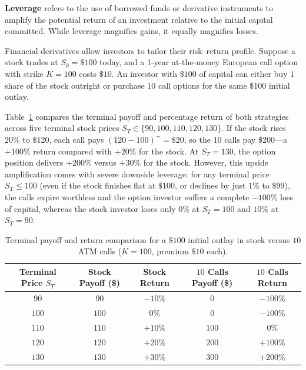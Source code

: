 \begin{definition}
\label{def:leverage}
\textbf{Leverage} refers to the use of borrowed funds or derivative instruments to amplify the potential return of an investment relative to the initial capital committed. While leverage magnifies gains, it equally magnifies losses.
\end{definition}

\begin{example}
\label{ex:option_leverage}
Financial derivatives allow investors to tailor their risk--return profile. Suppose a stock trades at $S_0 = \$100$ today, and a 1-year at-the-money European call option with strike $K = 100$ costs $\$10$. An investor with $\$100$ of capital can either buy $1$ share of the stock outright or purchase $10$ call options for the same $\$100$ initial outlay.

Table~\ref{tab:option_leverage} compares the terminal payoff and percentage return of both strategies across five terminal stock prices $S_T \in \{90, 100, 110, 120, 130\}$. If the stock rises $20\%$ to $\$120$, each call pays $(120 - 100)^+ = \$20$, so the $10$ calls pay $\$200$---a $+100\%$ return compared with $+20\%$ for the stock. At $S_T = 130$, the option position delivers $+200\%$ versus $+30\%$ for the stock. However, this upside amplification comes with severe downside leverage: for any terminal price $S_T \le 100$ (even if the stock finishes flat at $\$100$, or declines by just $1\%$ to $\$99$), the calls expire worthless and the option investor suffers a complete $-100\%$ loss of capital, whereas the stock investor loses only $0\%$ at $S_T = 100$ and $10\%$ at $S_T = 90$.

\begin{table}[!ht]
    \centering
    \caption{Terminal payoff and return comparison for a $\$100$ initial outlay in stock versus $10$ ATM calls ($K = 100$, premium $\$10$ each).}
    \label{tab:option_leverage}
    \begin{tabular}{ccccc}
        \toprule
        Terminal Price $S_T$ & Stock Payoff (\$) & Stock Return & $10$ Calls Payoff (\$) & $10$ Calls Return \\
        \midrule
        $90$  & $90$  & $-10\%$ & $0$   & $-100\%$ \\
        $100$ & $100$ & $0\%$   & $0$   & $-100\%$ \\
        $110$ & $110$ & $+10\%$ & $100$ & $0\%$    \\
        $120$ & $120$ & $+20\%$ & $200$ & $+100\%$ \\
        $130$ & $130$ & $+30\%$ & $300$ & $+200\%$ \\
        \bottomrule
    \end{tabular}
\end{table}
\end{example}

